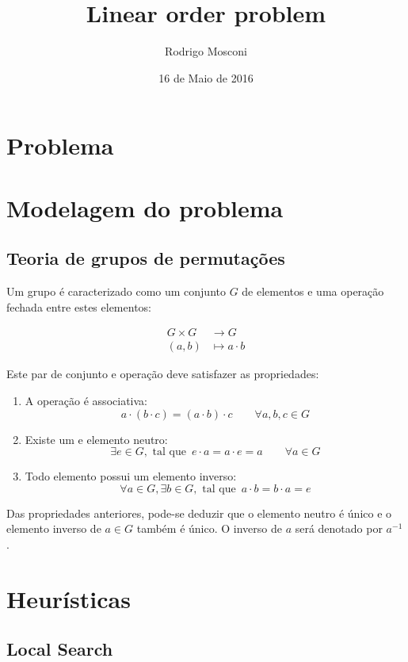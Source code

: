 \documentclass[a4paper,10pt,twocolumn]{article}
\author{Rodrigo Mosconi}
\title{Linear order problem}
\date{16 de Maio de 2016}
\begin{document}
\maketitle
\tableofcontents

\section{Problema}
\section{Modelagem do problema}
\subsection{Teoria de grupos de permutações}
Um grupo é caracterizado como um conjunto $G$ de elementos e uma operação
fechada entre
estes elementos:

\begin{align*}
  G \times G & \rightarrow G \\
  (a,b) & \mapsto a \cdot b
\end{align*}

  Este par de conjunto e operação deve satisfazer as
propriedades:
\begin{enumerate}
\item A operação é associativa:\\
  $$ a \cdot ( b \cdot c) = ( a \cdot b) \cdot c \qquad \forall a,b,c \in G$$
\item Existe um e elemento neutro:\\
  $$ \exists e \in G, \textrm{ tal que }\, e \cdot a = a \cdot e = a \qquad \forall a \in G $$
\item Todo elemento possui um elemento inverso:\\
  $$ \forall a \in G, \exists b \in G,\textrm{ tal que }\, a \cdot b = b \cdot a = e $$
\end{enumerate}

Das propriedades anteriores, pode-se deduzir que o elemento neutro é único e o
elemento 
inverso de $a \in G$ também é único.  O inverso de $a$ será denotado por $a^{-1}$.

\section{Heurísticas}
\subsection{Local Search}
\end{document}
